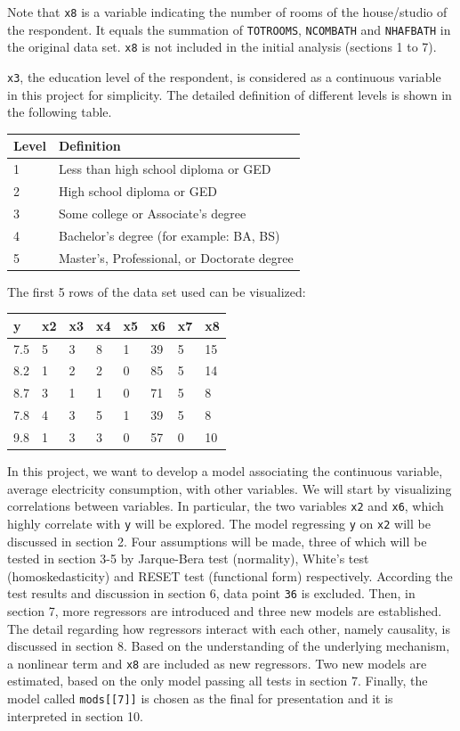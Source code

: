 \documentclass[a4paper]{article}
\begin{document}
Note that \texttt{x8} is a variable indicating the number of rooms of
the house/studio of the respondent. It equals the summation of
\texttt{TOTROOMS}, \texttt{NCOMBATH} and \texttt{NHAFBATH} in the
original data set. \texttt{x8} is not included in the initial analysis
(sections 1 to 7).

\texttt{x3}, the education level of the respondent, is considered as a
continuous variable in this project for simplicity. The detailed
definition of different levels is shown in the following table.

\begin{longtable}[]{@{}ll@{}}
\toprule
Level & Definition\tabularnewline
\midrule
\endhead
1 & Less than high school diploma or GED\tabularnewline
2 & High school diploma or GED\tabularnewline
3 & Some college or Associate's degree\tabularnewline
4 & Bachelor's degree (for example: BA, BS)\tabularnewline
5 & Master's, Professional, or Doctorate degree\tabularnewline
\bottomrule
\end{longtable}

The first 5 rows of the data set used can be visualized:

\begin{table}[H]
\centering
\begin{tabular}{llllllll}
\toprule
y & x2 & x3 & x4 & x5 & x6 & x7 & x8\\
\midrule
7.5 & 5 & 3 & 8 & 1 & 39 & 5 & 15\\
8.2 & 1 & 2 & 2 & 0 & 85 & 5 & 14\\
8.7 & 3 & 1 & 1 & 0 & 71 & 5 & 8\\
7.8 & 4 & 3 & 5 & 1 & 39 & 5 & 8\\
9.8 & 1 & 3 & 3 & 0 & 57 & 0 & 10\\
\bottomrule
\end{tabular}
\end{table}

In this project, we want to develop a model associating the continuous
variable, average electricity consumption, with other variables. We will
start by visualizing correlations between variables. In particular, the
two variables \texttt{x2} and \texttt{x6}, which highly correlate with
\texttt{y} will be explored. The model regressing \texttt{y} on
\texttt{x2} will be discussed in section 2. Four assumptions will be
made, three of which will be tested in section 3-5 by Jarque-Bera test
(normality), White's test (homoskedasticity) and RESET test (functional
form) respectively. According the test results and discussion in section
6, data point \texttt{36} is excluded. Then, in section 7, more
regressors are introduced and three new models are established. The
detail regarding how regressors interact with each other, namely
causality, is discussed in section 8. Based on the understanding of the
underlying mechanism, a nonlinear term and \texttt{x8} are included as
new regressors. Two new models are estimated, based on the only model
passing all tests in section 7. Finally, the model called
\texttt{mods{[}{[}7{]}{]}} is chosen as the final for presentation and
it is interpreted in section 10.
\end{document}
